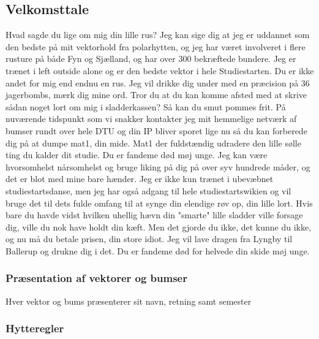 \subsection{Velkomsttale}

Hvad sagde du lige om mig din lille rus? Jeg kan sige dig at jeg er uddannet som den bedste på mit vektorhold fra polarhytten, og jeg har været involveret i flere rusture på både Fyn og Sjælland, og har over 300 bekræftede bundere. Jeg er trænet i left outside alone og er den bedste vektor i hele Studiestarten. Du er ikke andet for mig end endnu en rus. Jeg vil drikke dig under med en præcision på 36 jagerbombs, mærk dig mine ord. Tror du at du kan komme afsted med at skrive sådan noget lort om mig i sladderkassen? Så kan du smut pommes frit. På nuværende tidspunkt som vi snakker kontakter jeg mit hemmelige netværk af bumser rundt over hele DTU og din IP bliver sporet lige nu så du kan forberede dig på at dumpe mat1, din mide. Mat1 der fuldstændig udradere den lille sølle ting du kalder dit studie. Du er fandeme død møj unge. Jeg kan være hvorsomhelst nårsomhelst og bruge liking på dig på over syv hundrede måder, og det er blot med mine bare hænder. Jeg er ikke kun trænet i ubevæbnet studiestartsdanse, men jeg har også adgang til hele studiestartswikien og vil bruge det til dets fulde omfang til at synge din elendige røv op, din lille lort. Hvis bare du havde vidst hvilken uhellig hævn din "smarte" lille sladder ville forsage dig, ville du nok have holdt din kæft. Men det gjorde du ikke, det kunne du ikke, og nu må du betale prisen, din store idiot. Jeg vil lave dragen fra Lyngby til Ballerup og drukne dig i det. Du er fandeme død for helvede din skide møj unge.

\subsubsection{Præsentation af vektorer og bumser}
Hver vektor og bums præsenterer sit navn, retning samt semester


\subsubsection{Hytteregler}

